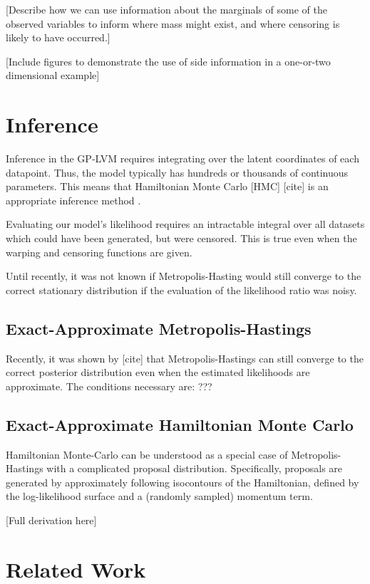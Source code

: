 \documentclass{article}
\begin{document}
[Describe how we can use information about the marginals of some of the observed variables to inform where mass might exist, and where censoring is likely to have occurred.]

[Include figures to demonstrate the use of side information in a one-or-two dimensional example]

\section{Inference}

Inference in the GP-LVM requires integrating over the latent coordinates of each datapoint.  Thus, the model typically has hundreds or thousands of continuous parameters.  This means that Hamiltonian Monte Carlo [HMC] [cite] is an appropriate inference method \cite{IwaDuvGha2012warped}.  

Evaluating our model's likelihood requires an intractable integral over all datasets which could have been generated, but were censored.  This is true even when the warping and censoring functions are given.

Until recently, it was not known if Metropolis-Hasting would still converge to the correct stationary distribution if the evaluation of the likelihood ratio was noisy.

\subsection{Exact-Approximate Metropolis-Hastings}

Recently, it was shown by [cite] that Metropolis-Hastings can still converge to the correct posterior distribution even when the estimated likelihoods are approximate.  The conditions necessary are: ???

\cite{eamcblogWilk10}

\subsection{Exact-Approximate Hamiltonian Monte Carlo}

Hamiltonian Monte-Carlo can be understood as a special case of Metropolis-Hastings with a complicated proposal distribution.  Specifically, proposals are generated by approximately following isocontours of the Hamiltonian, defined by the log-likelihood surface and a (randomly sampled) momentum term.

[Full derivation here]

\section{Related Work}
\end{document}
